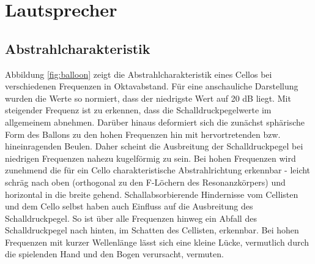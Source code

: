 \newcommand{\files}[1]{
    \hfill
    \mbox{
        $\hookrightarrow$
        \texttt{#1}
    }
}

\section{Lautsprecher}
\label{sec:1}

\subsection{Abstrahlcharakteristik}
\label{subsec:a}
Abbildung \ref{fig:balloon} zeigt die Abstrahlcharakteristik eines Cellos bei verschiedenen Frequenzen in Oktavabstand.
Für eine anschauliche Darstellung wurden die Werte so normiert, dass der niedrigste Wert auf 20 dB liegt.
Mit steigender Frequenz ist zu erkennen, dass die Schalldruckpegelwerte im allgemeinem abnehmen.
Darüber hinaus deformiert sich die zunächst sphärische Form des Ballons zu den hohen Frequenzen hin mit hervortretenden bzw. hineinragenden Beulen.
Daher scheint die Ausbreitung der Schalldruckpegel bei niedrigen Frequenzen nahezu kugelförmig zu sein.
Bei hohen Frequenzen wird zunehmend die für ein Cello charakteristische Abstrahlrichtung erkennbar - leicht schräg nach oben (orthogonal zu den F-Löchern des Resonanzkörpers) und horizontal in die breite gehend.
Schallabsorbierende Hindernisse vom Cellisten und dem Cello selbst haben auch Einfluss auf die Ausbreitung des Schalldruckpegel.
So ist über alle Frequenzen hinweg ein Abfall des Schalldruckpegel nach hinten, im Schatten des Cellisten, erkennbar.
Bei hohen Frequenzen mit kurzer Wellenlänge lässt sich eine kleine Lücke, vermutlich durch die spielenden Hand und den Bogen verursacht, vermuten.


